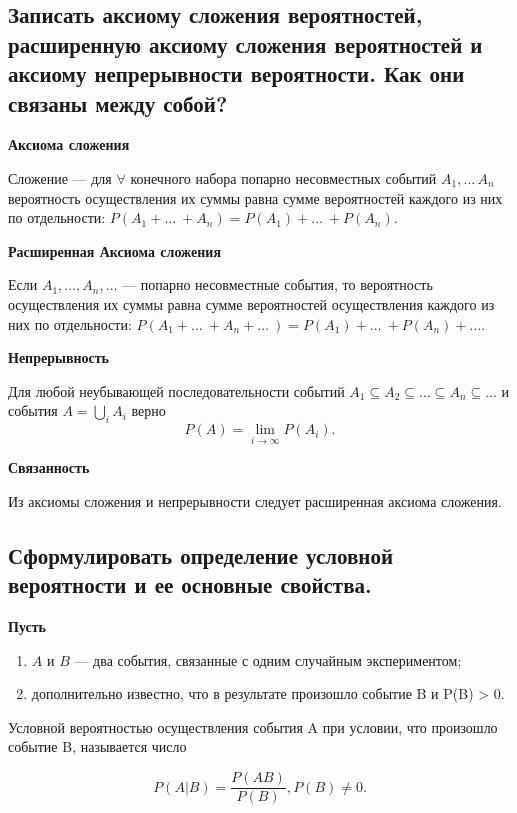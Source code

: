 \subsection{Записать аксиому сложения вероятностей, расширенную аксиому сложения вероятностей и аксиому непрерывности вероятности. Как они связаны между собой?}

\textbf{Аксиома сложения}

Сложение --- для $\forall$ конечного набора попарно несовместных событий $A_1, \dots\, A_n$ вероятность осуществления их суммы равна сумме вероятностей каждого из них по отдельности: $P(A_1 + \dots\ + A_n) = P(A_1) + \dots\ + P(A_n)$.

\textbf{Расширенная Аксиома сложения}

Если $A_1, \dots, A_n, \dots$ --- попарно несовместные события, то вероятность осуществления их суммы равна сумме вероятностей осуществления каждого из них по отдельности:  $P(A_1 + \dots\ + A_n + \dots\ ) = P(A_1) + \dots\ + P(A_n) + \dots$.

\textbf{Непрерывность}

Для любой неубывающей последовательности событий $A_1 \subseteq A_2 \subseteq \dots \subseteq A_n \subseteq \dots$ и события $ A = \bigcup\limits_i A_i$ верно 
\begin{equation}
	P(A) = \lim\limits_{i \rightarrow \infty} P(A_i).
\end{equation}

\textbf{Связанность}

Из аксиомы сложения и непрерывности следует расширенная аксиома сложения.

\subsection{Сформулировать определение условной вероятности и ее основные свойства.}

\textbf{Пусть} 

\begin{enumerate}
	\item $A$ и $B$ --- два события, связанные с одним случайным экспериментом;
	\item дополнительно известно, что в результате произошло событие B и P(B) > 0.
\end{enumerate}

Условной вероятностью осуществления события A при условии, что произошло событие B, называется число

\begin{equation}
	P(A|B) = \frac{P(AB)}{P(B)}, P(B) \neq 0.
\end{equation}

